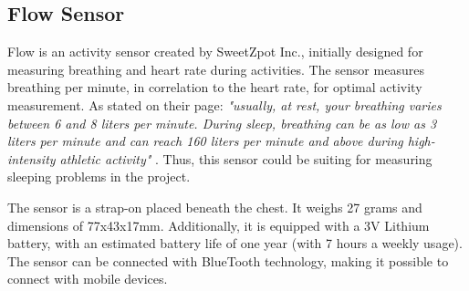 


\subsection{Flow Sensor}\label{bg:flow}
Flow is an activity sensor created by SweetZpot Inc., initially designed for measuring breathing and heart rate during activities. The sensor measures breathing per minute, in correlation to the heart rate, for optimal activity measurement. As stated on their page: \textit{"usually, at rest, your breathing varies between 6 and 8 liters per minute. During sleep, breathing can be as low as 3 liters per minute and can reach 160 liters per minute and above during high-intensity athletic activity"} \cite{flow}. Thus, this sensor could be suiting for measuring sleeping problems in the project.

The sensor is a  strap-on placed beneath the chest. It weighs 27 grams and dimensions of 77x43x17mm. Additionally, it is equipped with a 3V Lithium battery, with an estimated battery life of one year (with 7 hours a weekly usage). The sensor can be connected with BlueTooth technology, making it possible to connect with mobile devices.